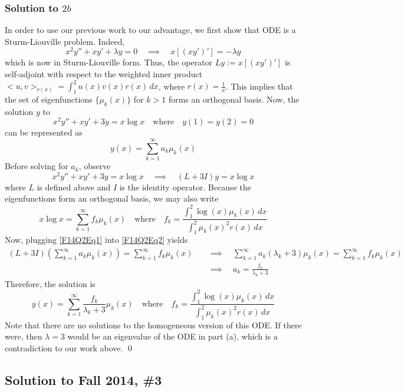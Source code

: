 \subsubsection*{Solution to $2b$}

In order to use our previous work to our advantage, we first show that ODE is a Sturm-Liouville problem. Indeed,
\[
x^2 y'' + xy' + \lambda y = 0 \quad \implies \quad x [ (xy')'] = -\lambda y
\]
which is now in Sturm-Liouville form. Thus, the operator $Ly := x[(xy')']$ is self-adjoint with respect to the weighted inner product $<u,v>_{r(x)} = \int_1^2 u(x)v(x) r(x) \, dx$, where $r(x) = \frac{1}{x}$. This implies that the set of eigenfunctions $\{ \mu_k(x) \}$ for $k > 1$ forms an orthogonal basis. Now, the solution $y$ to
\[
x^2 y'' + x y' + 3y = x \log x \quad \text{where} \quad y(1) = y(2) = 0
\]
can be represented as
\begin{equation}
\label{F14Q2Eq1}
y(x) = \sum_{k=1}^{\infty} a_k \mu_k(x)
\end{equation}
Before solving for $a_k$, observe
\begin{equation}
\label{F14Q2Eq2}
x^2 y'' + x y' + 3y = x \log x \quad \implies \quad (L + 3I) y = x \log x
\end{equation}
where $L$ is defined above and $I$ is the identity operator. Because the eigenfunctions form an orthogonal basis, we may also write
\[
x \log x = \sum_{k=1}^{\infty} f_k \mu_k(x) \quad \text{where} \quad f_k = \dfrac{\int_1^2 \log (x) \mu_k(x) \, dx}{\int_1^2 \mu_k(x)^2 r(x) \, dx}
\]
Now, plugging \eqref{F14Q2Eq1} into \eqref{F14Q2Eq2} yields
\begin{align*}
(L + 3I) \left( \sum_{k=1}^{\infty} a_k \mu_k(x) \right) = \sum_{k=1}^{\infty} f_k \mu_k(x) \quad &\implies \quad \sum_{k=1}^{\infty} a_k (\lambda_k + 3) \mu_k (x) = \sum_{k=1}^{\infty} f_k \mu_k(x) \\
&\implies \quad a_k = \frac{f_k}{\lambda_k + 3}
\end{align*}
Therefore, the solution is
\[
y(x) = \sum_{k=1}^{\infty} \frac{f_k}{\lambda_k+3} \mu_k(x) \quad \text{where} \quad f_k = \dfrac{\int_1^2 \log (x) \mu_k(x) \, dx}{\int_1^2 \mu_k(x)^2 r(x) \, dx}
\]
Note that there are no solutions to the homogeneous version of this ODE. If there were, then $\lambda = 3$ would be an eigenvalue of the ODE in part (a), which is a contradiction to our work above. \hfill \qed


\subsection*{Solution to Fall 2014, \#3}
\label{F14Q3}

